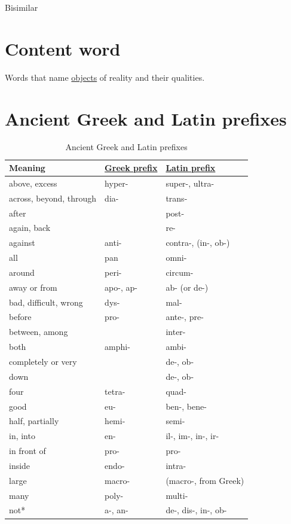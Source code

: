 \documentclass[a4paper,14pt,oneside]{book}
\begin{document}
\label{orgb941036}Bisimilar

\section{\label{org0f5bcf3}Content word}
\label{sec:org92ff22a}
Words that name \hyperref[orgbc3544a]{objects} of reality and their qualities.

\section{Ancient Greek and Latin prefixes}
\label{sec:org5c71aa6}
\begin{table}[htbp]
\caption{\label{tab--ancient-greek-latin-prefixes}Ancient Greek and Latin prefixes}
\centering
\begin{tabu} spread \linewidth {lll}
\toprule
Meaning & \hyperref[org117e8d7]{Greek prefix} & \hyperref[orga141432]{Latin prefix}\\
\midrule
above, excess & hyper- & super-, ultra-\\
across, beyond, through & dia- & trans-\\
after &  & post-\\
again, back &  & re-\\
against & anti- & contra-, (in-, ob-)\\
all & pan & omni-\\
around & peri- & circum-\\
away or from & apo-, ap- & ab- (or de-)\\
bad, difficult, wrong & dys- & mal-\\
before & pro- & ante-, pre-\\
between, among &  & inter-\\
both & amphi- & ambi-\\
completely or very &  & de-, ob-\\
down &  & de-, ob-\\
four & tetra- & quad-\\
good & eu- & ben-, bene-\\
half, partially & hemi- & semi-\\
in, into & en- & il-, im-, in-, ir-\\
in front of & pro- & pro-\\
inside & endo- & intra-\\
large & macro- & (macro-, from Greek)\\
many & poly- & multi-\\
not* & a-, an- & de-, dis-, in-, ob-\\

\end{tabu}
\end{table}
\end{document}
